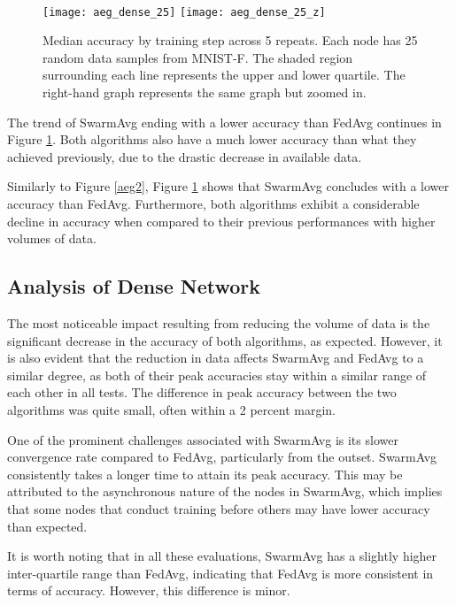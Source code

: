 \begin{figure}[H] 
	 \\
	\texttt{[image: aeg\_dense\_25]}
	\texttt{[image: aeg\_dense\_25\_z]}
	\caption{Median accuracy by training step across 5 repeats. Each node has 25 random data samples from MNIST-F. The shaded region surrounding each line represents the upper and lower quartile. The right-hand graph represents the same graph but zoomed in.}
	\label{aeg3}
\end{figure}

The trend of SwarmAvg ending with a lower accuracy than FedAvg continues in Figure \ref{aeg3}. Both algorithms also have a much lower accuracy than what they achieved previously, due to the drastic decrease in available data.

Similarly to Figure \ref{aeg2}, Figure \ref{aeg3} shows that SwarmAvg concludes with a lower accuracy than FedAvg. Furthermore, both algorithms exhibit a considerable decline in accuracy when compared to their previous performances with higher volumes of data.

\subsection{Analysis of Dense Network}

The most noticeable impact resulting from reducing the volume of data is the significant decrease in the accuracy of both algorithms, as expected. However, it is also evident that the reduction in data affects SwarmAvg and FedAvg to a similar degree, as both of their peak accuracies stay within a similar range of each other in all tests. The difference in peak accuracy between the two algorithms was quite small, often within a 2 percent margin.

One of the prominent challenges associated with SwarmAvg is its slower convergence rate compared to FedAvg, particularly from the outset. SwarmAvg consistently takes a longer time to attain its peak accuracy. This may be attributed to the asynchronous nature of the nodes in SwarmAvg, which implies that some nodes that conduct training before others may have lower accuracy than expected.

It is worth noting that in all these evaluations, SwarmAvg has a slightly higher inter-quartile range than FedAvg, indicating that FedAvg is more consistent in terms of accuracy. However, this difference is minor.

